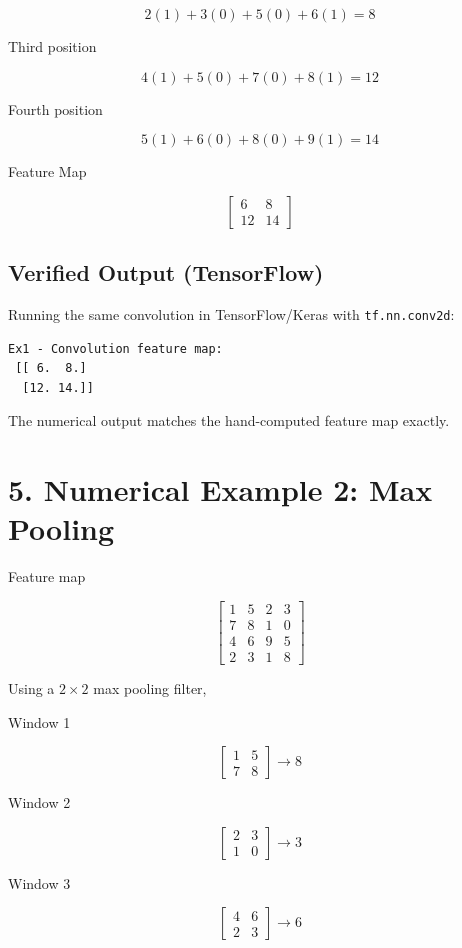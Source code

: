 \documentclass[11pt]{article}
\begin{document}
\[
2(1)+3(0)+5(0)+6(1)=8
\]

Third position

\[
4(1)+5(0)+7(0)+8(1)=12
\]

Fourth position

\[
5(1)+6(0)+8(0)+9(1)=14
\]

Feature Map

\[
\begin{bmatrix}
6&8\\
12&14
\end{bmatrix}
\]

\subsection*{Verified Output (TensorFlow)}

Running the same convolution in TensorFlow/Keras with \texttt{tf.nn.conv2d}:

\begin{verbatim}
Ex1 - Convolution feature map:
 [[ 6.  8.]
  [12. 14.]]
\end{verbatim}

The numerical output matches the hand-computed feature map exactly.

\section*{5. Numerical Example 2: Max Pooling}

Feature map

\[
\begin{bmatrix}
1&5&2&3\\
7&8&1&0\\
4&6&9&5\\
2&3&1&8
\end{bmatrix}
\]

Using a $2\times2$ max pooling filter,

Window 1

\[
\begin{bmatrix}
1&5\\
7&8
\end{bmatrix}
\rightarrow 8
\]

Window 2

\[
\begin{bmatrix}
2&3\\
1&0
\end{bmatrix}
\rightarrow3
\]

Window 3

\[
\begin{bmatrix}
4&6\\
2&3
\end{bmatrix}
\rightarrow6
\]
\end{document}

